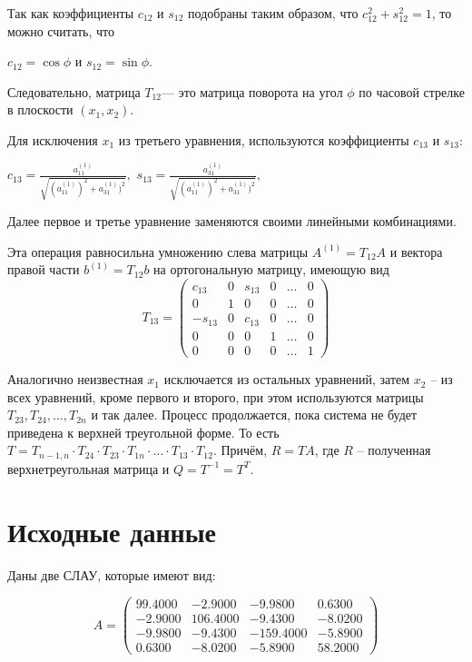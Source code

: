 \documentclass[12pt, a4paper]{article}
\begin{document}
Так как коэффициенты $c_{12}$ и $s_{12}$ подобраны таким образом, что $c_{12}^{2} + s_{12}^{2}=1$, то можно считать, что 
\begin{center}
$c_{12}=\cos{\phi}$ и $s_{12}=\sin{\phi}.$ 
\end{center}	

Следовательно, матрица $T_{12}$--- это матрица поворота на угол $\phi$ по часовой стрелке в плоскости $(x_1,x_2)$. 

\pagebreak

Для исключения $x_1$ из третьего уравнения, используются коэффициенты $c_{13}$ и $s_{13}$:
\begin{center}
    $c_{13}=\frac{a_{11}^{(1)}}{\sqrt{(a_{11}^{(1)})^2+a_{31}^{(1)})^2}},$
    $s_{13}=\frac{a_{31}^{(1)}}{\sqrt{(a_{11}^{(1)})^2+a_{31}^{(1)})^2}},$
\end{center}
    
Далее первое и третье уравнение заменяются своими линейными комбинациями. 

Эта операция равносильна умножению слева матрицы $A^{(1)}=T_{12}A$ и вектора правой части $b^{(1)}=T_{12}b$ на ортогональную матрицу, имеющую вид 
\[
T_{13}=
\begin{pmatrix}
c_{13} & 0 & s_{13} & 0 & \ldots & 0 \\
0 & 1 & 0 & 0 & \ldots & 0 \\
-s_{13} & 0 & c_{13} & 0 & \ldots & 0 \\
0 & 0 & 0 & 1 & \ldots & 0 \\
0 & 0 & 0 & 0 & \ldots & 1
\end{pmatrix}
\]

Аналогично неизвестная $x_{1}$ исключается из остальных уравнений, затем \linebreak $x_{2}$ -- из всех уравнений, кроме первого и второго, при этом используются матрицы $T_{23},T_{24}, \ldots, T_{2n}$ и так далее. Процесс продолжается, пока система не будет приведена к верхней треугольной форме. То есть $ T = T_{n - 1, n} \cdot T_{24} \cdot T_{23} \cdot T_{1n} \cdot \ldots \cdot T_{13} \cdot T_{12}. $ Причём, $R=TA$, где $R$ -- полученная верхнетреугольная матрица и $Q=T^{-1}=T^{T}.$

\newpage

\section{Исходные данные}
Даны две СЛАУ, которые имеют вид: 

\[
    A = 
    \begin{pmatrix}
     99.4000  &   -2.9000  &   -9.9800   &   0.6300  \\  
     -2.9000  &  106.4000  &   -9.4300   &  -8.0200  \\  
     -9.9800  &   -9.4300  & -159.4000   &  -5.8900  \\  
      0.6300  &   -8.0200  &   -5.8900   &  58.2000  
    \end{pmatrix}
\]
\end{document}
